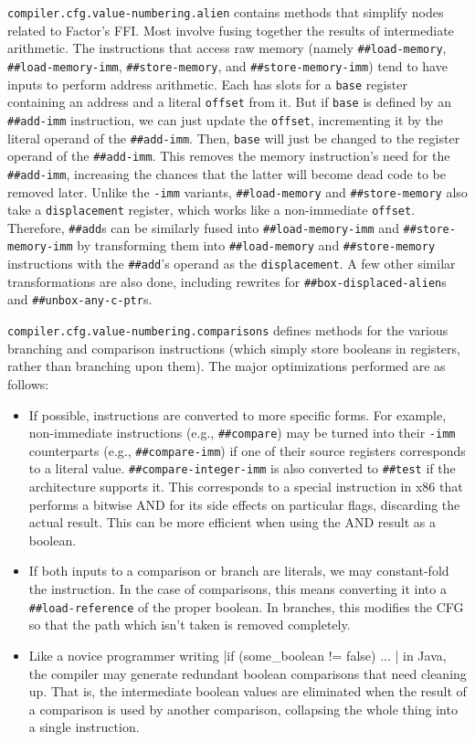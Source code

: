\begin{sloppypar}
\Verb|compiler.cfg.value-numbering.alien| contains methods that simplify nodes
related to Factor's \gls{FFI}.  Most involve fusing together the results of
intermediate arithmetic.  The instructions that access raw memory (namely
\Verb|##load-memory|, \Verb|##load-memory-imm|, \Verb|##store-memory|, and
\Verb|##store-memory-imm|) tend to have inputs to perform address arithmetic.
Each has slots for a \Verb|base| register containing an address and a literal
\Verb|offset| from it.  But if \Verb|base| is defined by an \Verb|##add-imm|
instruction, we can just update the \Verb|offset|, incrementing it by the
literal operand of the \Verb|##add-imm|.  Then, \Verb|base| will just be
changed to the register operand of the \Verb|##add-imm|.  This removes the
memory instruction's need for the \Verb|##add-imm|, increasing the chances that
the latter will become dead code to be removed later.  Unlike the \Verb|-imm|
variants, \Verb|##load-memory| and \Verb|##store-memory| also take a
\Verb|displacement| register, which works like a non-immediate \Verb|offset|.
Therefore, \Verb|##add|s can be similarly fused into \Verb|##load-memory-imm|
and \Verb|##store-memory-imm| by transforming them into \Verb|##load-memory|
and \Verb|##store-memory| instructions with the \Verb|##add|'s operand as the
\Verb|displacement|.  A few other similar transformations are also done,
including rewrites for \Verb|##box-displaced-alien|s and
\Verb|##unbox-any-c-ptr|s.
\end{sloppypar}

\Verb|compiler.cfg.value-numbering.comparisons| defines methods for the
various branching and comparison instructions (which simply store booleans in
registers, rather than branching upon them).  The major optimizations performed
are as follows:
%
\begin{itemize}
%
\item If possible, instructions are converted to more specific forms.  For
example, non-immediate instructions (e.g., \Verb|##compare|) may be turned
into their \Verb|-imm| counterparts (e.g., \Verb|##compare-imm|)  if one of
their source registers corresponds to a literal value.
\Verb|##compare-integer-imm| is also converted to \Verb|##test| if the
architecture supports it.  This corresponds to a special instruction in x86
that performs a bitwise AND for its side effects on particular flags,
discarding the actual result.  This can be more efficient when using the AND
result as a boolean.
%
\item If both inputs to a comparison or branch are literals, we may
constant-fold the instruction.  In the case of comparisons, this means
converting it into a \Verb|##load-reference| of the proper boolean.  In
branches, this modifies the \gls{CFG} so that the path which isn't taken is
removed completely.
%
\item Like a novice programmer writing
%
|if (some_boolean != false) { ... }|
%
in Java, the compiler may generate redundant boolean comparisons that need
cleaning up.  That is, the intermediate boolean values are eliminated when the
result of a comparison is used by another comparison, collapsing the whole
thing into a single instruction.
%
\end{itemize}


